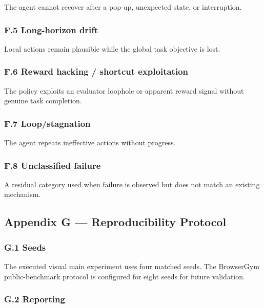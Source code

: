 \documentclass[
]{article}
\begin{document}
The agent cannot recover after a pop-up, unexpected state, or
interruption.

\subsubsection{F.5 Long-horizon drift}\label{f.5-long-horizon-drift}

Local actions remain plausible while the global task objective is lost.

\subsubsection{F.6 Reward hacking / shortcut
exploitation}\label{f.6-reward-hacking-shortcut-exploitation}

The policy exploits an evaluator loophole or apparent reward signal
without genuine task completion.

\subsubsection{F.7 Loop/stagnation}\label{f.7-loopstagnation}

The agent repeats ineffective actions without progress.

\subsubsection{F.8 Unclassified failure}\label{f.8-unclassified-failure}

A residual category used when failure is observed but does not match an
existing mechanism.

\subsection{Appendix G --- Reproducibility
Protocol}\label{appendix-g-reproducibility-protocol}

\subsubsection{G.1 Seeds}\label{g.1-seeds}

The executed visual main experiment uses four matched seeds. The
BrowserGym public-benchmark protocol is configured for eight seeds for
future validation.

\subsubsection{G.2 Reporting}\label{g.2-reporting}
\end{document}
